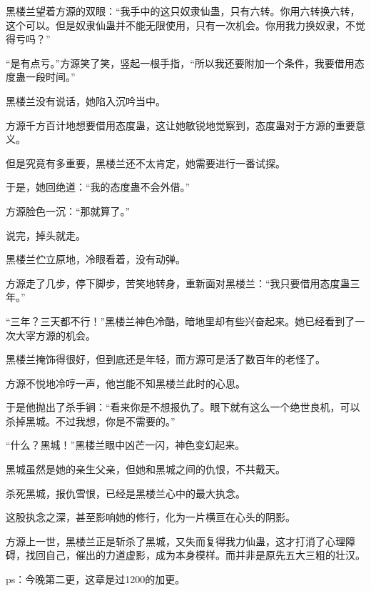 \begin{this_body}
黑楼兰望着方源的双眼：“我手中的这只奴隶仙蛊，只有六转。你用六转换六转，这个可以。但是奴隶仙蛊并不能无限使用，只有一次机会。你用我力换奴隶，不觉得亏吗？”

“是有点亏。”方源笑了笑，竖起一根手指，“所以我还要附加一个条件，我要借用态度蛊一段时间。”

黑楼兰没有说话，她陷入沉吟当中。

方源千方百计地想要借用态度蛊，这让她敏锐地觉察到，态度蛊对于方源的重要意义。

但是究竟有多重要，黑楼兰还不太肯定，她需要进行一番试探。

于是，她回绝道：“我的态度蛊不会外借。”

方源脸色一沉：“那就算了。”

说完，掉头就走。

黑楼兰伫立原地，冷眼看着，没有动弹。

方源走了几步，停下脚步，苦笑地转身，重新面对黑楼兰：“我只要借用态度蛊三年。”

“三年？三天都不行！”黑楼兰神色冷酷，暗地里却有些兴奋起来。她已经看到了一次大宰方源的机会。

黑楼兰掩饰得很好，但到底还是年轻，而方源可是活了数百年的老怪了。

方源不悦地冷哼一声，他岂能不知黑楼兰此时的心思。

于是他抛出了杀手锏：“看来你是不想报仇了。眼下就有这么一个绝世良机，可以杀掉黑城。不过我想，你是不需要的。”

“什么？黑城！”黑楼兰眼中凶芒一闪，神色变幻起来。

黑城虽然是她的亲生父亲，但她和黑城之间的仇恨，不共戴天。

杀死黑城，报仇雪恨，已经是黑楼兰心中的最大执念。

这股执念之深，甚至影响她的修行，化为一片横亘在心头的阴影。

方源上一世，黑楼兰正是斩杀了黑城，又失而复得我力仙蛊，这才打消了心理障碍，找回自己，催出的力道虚影，成为本身模样。而并非是原先五大三粗的壮汉。

ps：今晚第二更，这章是过1200的加更。

\end{this_body}

